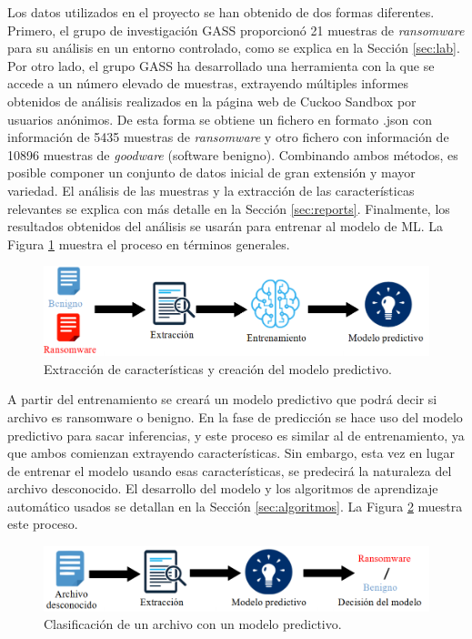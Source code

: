 Los datos utilizados en el proyecto se han obtenido de dos formas diferentes. Primero, el grupo de investigación GASS \cite{GASS01} proporcionó 21 muestras de \textit{ransomware} para su análisis en un entorno controlado, como se explica en la Sección \ref{sec:lab}. Por otro lado, el grupo GASS \cite{GASS01} ha desarrollado una herramienta con la que se accede a un número elevado de muestras, extrayendo múltiples informes obtenidos de análisis realizados en la página web de Cuckoo Sandbox por usuarios anónimos. De esta forma se obtiene un fichero en formato .json con información de 5435 muestras de \textit{ransomware} y otro fichero con información de 10896 muestras de \textit{goodware} (software benigno). Combinando ambos métodos, es posible componer un conjunto de datos inicial de gran extensión y mayor variedad. El análisis de las muestras y la extracción de las características relevantes se explica con más detalle en la Sección \ref{sec:reports}. Finalmente, los resultados obtenidos del análisis se usarán para entrenar al modelo de \gls{ML}.
La Figura \ref{fig:fase1} muestra el proceso en términos generales.

\begin{figure}[h!]
\begin{center}
\includegraphics[width=1\linewidth]{images/fase1.png}
\end{center}
\caption{Extracción de características y creación del modelo predictivo.}
\label{fig:fase1} 
\end{figure}

A partir del entrenamiento se creará un modelo predictivo que podrá decir si archivo es ransomware o benigno. En la fase de predicción se hace uso del modelo predictivo para sacar inferencias, y este proceso es similar al de entrenamiento, ya que ambos comienzan extrayendo características. Sin embargo, esta vez en lugar de entrenar el modelo usando esas características, se predecirá la naturaleza del archivo desconocido. El desarrollo del modelo y los algoritmos de aprendizaje automático usados se detallan en la Sección \ref{sec:algoritmos}. 
La Figura \ref{fig:fase2} muestra este proceso.

\begin{figure}[h!]
\begin{center}
\includegraphics[width=1\linewidth]{images/fase2.png}
\end{center}
\caption{Clasificación de un archivo con un modelo predictivo.}
\label{fig:fase2} 
\end{figure}


